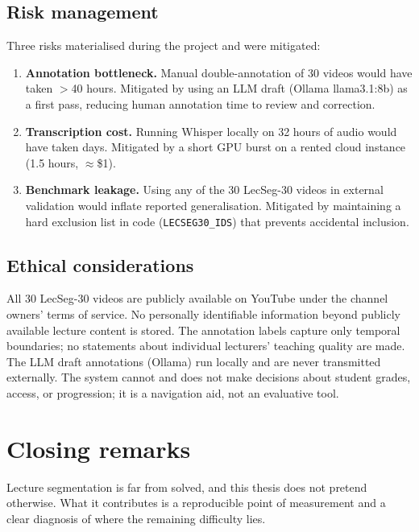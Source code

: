 \subsection*{Risk management}

Three risks materialised during the project and were mitigated:
\begin{enumerate}
  \item \textbf{Annotation bottleneck.}
        Manual double-annotation of 30 videos would have taken $>$40 hours.
        Mitigated by using an LLM draft (Ollama llama3.1:8b) as a first pass,
        reducing human annotation time to review and correction.
  \item \textbf{Transcription cost.}
        Running Whisper locally on 32 hours of audio would have taken days.
        Mitigated by a short GPU burst on a rented cloud instance (1.5 hours,
        $\approx$\$1).
  \item \textbf{Benchmark leakage.}
        Using any of the 30 LecSeg-30 videos in external validation would
        inflate reported generalisation.
        Mitigated by maintaining a hard exclusion list in code
        (\texttt{LECSEG30\_IDS}) that prevents accidental inclusion.
\end{enumerate}

\subsection*{Ethical considerations}

All 30 LecSeg-30 videos are publicly available on YouTube under the channel
owners' terms of service.
No personally identifiable information beyond publicly available lecture content
is stored.
The annotation labels capture only temporal boundaries; no statements about
individual lecturers' teaching quality are made.
The LLM draft annotations (Ollama) run locally and are never transmitted
externally.
The system cannot and does not make decisions about student grades, access,
or progression; it is a navigation aid, not an evaluative tool.

\section{Closing remarks}

Lecture segmentation is far from solved, and this thesis does not pretend
otherwise.
What it contributes is a reproducible point of measurement and a clear
diagnosis of where the remaining difficulty lies.

